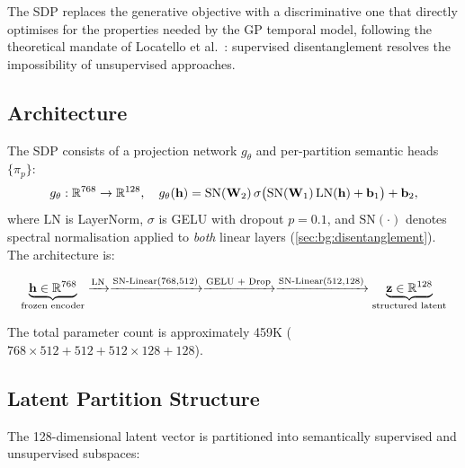 The SDP replaces the generative objective with a discriminative one that
directly optimises for the properties needed by the GP temporal model,
following the theoretical mandate of Locatello et al.\
\cite{locatello2019challenging}: supervised disentanglement resolves the
impossibility of unsupervised approaches.

\subsection{Architecture}
\label{sec:sdp:architecture}

The SDP consists of a projection network $g_\theta$ and per-partition semantic
heads $\{\pi_p\}$:
\begin{equation}
  g_\theta: \mathbb{R}^{768} \to \mathbb{R}^{128}, \quad
  g_\theta(\mathbf{h}) = \text{SN}(\mathbf{W}_2)\,
    \sigma\bigl(\text{SN}(\mathbf{W}_1)\,
    \text{LN}(\mathbf{h}) + \mathbf{b}_1\bigr) + \mathbf{b}_2,
  \label{eq:sdp_forward}
\end{equation}
where $\text{LN}$ is LayerNorm, $\sigma$ is GELU with dropout $p=0.1$, and
$\text{SN}(\cdot)$ denotes spectral normalisation applied to \emph{both}
linear layers (\cref{sec:bg:disentanglement}). The architecture is:

\begin{equation}
  \underbrace{\mathbf{h} \in \mathbb{R}^{768}}_{\text{frozen encoder}}
  \xrightarrow{\text{LN}}
  \xrightarrow{\text{SN-Linear}(768, 512)}
  \xrightarrow{\text{GELU + Drop}}
  \xrightarrow{\text{SN-Linear}(512, 128)}
  \underbrace{\mathbf{z} \in \mathbb{R}^{128}}_{\text{structured latent}}
  \label{eq:sdp_pipeline}
\end{equation}

The total parameter count is approximately 459K
($768 \times 512 + 512 + 512 \times 128 + 128$).

\subsection{Latent Partition Structure}
\label{sec:sdp:partitions}

The 128-dimensional latent vector is partitioned into semantically supervised
and unsupervised subspaces:

